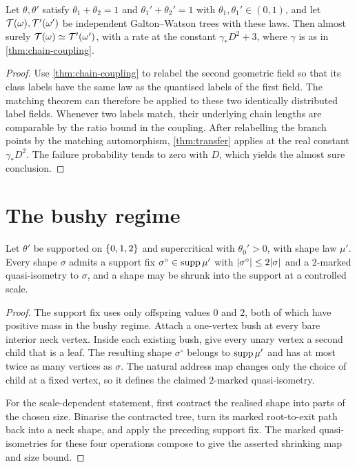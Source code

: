 \begin{proposition}
\label{thm:cross-law}
\leanok
{}
Let $\theta,\theta'$ satisfy $\theta_1+\theta_2=1$ and $\theta_1'+\theta_2'=1$ with
$\theta_1,\theta_1'\in(0,1)$, and let $\mathcal{T}(\omega),\mathcal{T}'(\omega')$ be independent Galton--Watson
trees with these laws. Then almost surely $\mathcal{T}(\omega)\simeq\mathcal{T}'(\omega')$, with a rate at the
constant $\gamma_*D^2+3$, where $\gamma$ is as in \cref{thm:chain-coupling}.
\end{proposition}

\begin{proof}
\leanok
{}
Use \cref{thm:chain-coupling} to relabel the second geometric field so that its class labels have
the same law as the quantised labels of the first field. The matching theorem can therefore be
applied to these two identically distributed label fields. Whenever two labels match, their
underlying chain lengths are comparable by the ratio bound in the coupling. After relabelling the
branch points by the matching automorphism, \cref{thm:transfer} applies at the real constant
$\gamma_*D^2$. The failure probability tends to zero with $D$, which yields the almost sure
conclusion.
\end{proof}

\section{The bushy regime}

\begin{lemma}
\label{thm:shape-shrink}
\leanok
{}
Let $\theta'$ be supported on $\{0,1,2\}$ and supercritical with $\theta_0'>0$, with shape
law $\mu'$. Every shape $\sigma$ admits a support fix $\sigma^\circ\in\operatorname{supp}\mu'$ with
$\lvert \sigma^\circ \rvert\leq2\lvert \sigma \rvert$ and a $2$-marked quasi-isometry to $\sigma$, and a shape
may be shrunk into the support at a controlled scale.
\end{lemma}

\begin{proof}
\leanok
{}
The support fix uses only offspring values $0$ and $2$, both of which have positive mass in the
bushy regime. Attach a one-vertex bush at every bare interior neck vertex. Inside each existing
bush, give every unary vertex a second child that is a leaf. The resulting shape
$\sigma^\circ$ belongs to $\operatorname{supp}\mu'$ and has at most twice as many vertices as $\sigma$.
The natural address map changes only the choice of child at a fixed vertex, so it defines the
claimed $2$-marked quasi-isometry.

For the scale-dependent statement, first contract the realised shape into parts of the chosen
size. Binarise the contracted tree, turn its marked root-to-exit path back into a neck shape, and
apply the preceding support fix. The marked quasi-isometries for these four operations compose to
give the asserted shrinking map and size bound.
\end{proof}

